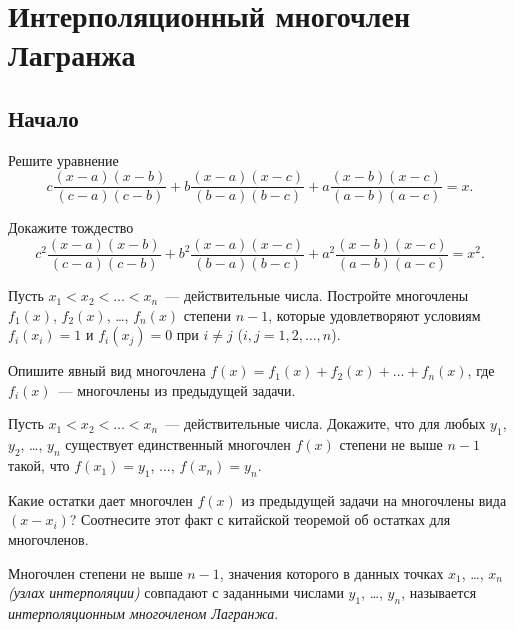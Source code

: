 

\section*{Интерполяционный многочлен Лагранжа}


\subsection*{Начало}

\begin{problems}

\item
Решите уравнение
\[
    c \frac{(x - a) (x - b)}{(c - a) (c - b)} +
    b \frac{(x - a) (x - c)}{(b - a) (b - c)} +
    a \frac{(x - b) (x - c)}{(a - b) (a - c)}
=
    x
.\]

\item
Докажите тождество
\[
    c^2 \frac{(x - a) (x - b)}{(c - a) (c - b)} +
    b^2 \frac{(x - a) (x - c)}{(b - a) (b - c)} +
    a^2 \frac{(x - b) (x - c)}{(a - b) (a - c)}
=
    x^2
.\]

\item
Пусть $x_1 < x_2 < \ldots < x_n$~--- действительные числа.
Постройте многочлены $f_1(x)$, $f_2(x)$, \ldots, $f_n(x)$ степени $n-1$,
которые удовлетворяют условиям $f_i(x_i) = 1$ и $f_i(x_j) = 0$ при
$i \neq j$ ($i, j = 1, 2, \ldots, n$).

\item
Опишите явный вид многочлена $f(x) = f_1(x) + f_2(x) + \ldots + f_n(x)$,
где $f_i(x)$~---  многочлены из предыдущей задачи.

\item
Пусть $x_1 < x_2 < \ldots < x_n$~--- действительные числа.
Докажите, что для любых $y_1$, $y_2$, \ldots, $y_n$ существует единственный
многочлен $f(x)$ степени не выше $n-1$ такой, что
$f(x_1) = y_1$, $\ldots$, $f(x_n) = y_n$.

\item
Какие остатки дает многочлен $f(x)$ из предыдущей задачи на многочлены вида
$(x - x_i)$?
Соотнесите этот факт с китайской теоремой об остатках для многочленов.

\end{problems}

Многочлен степени не выше $n - 1$, значения которого в данных точках
$x_1$, \ldots, $x_n$ \emph{(узлах интерполяции)} совпадают с заданными числами
$y_1$, \ldots, $y_n$, называется \emph{интерполяционным многочленом Лагранжа}.

